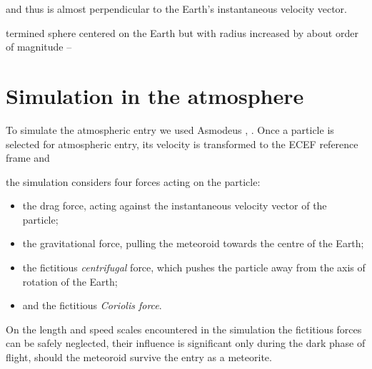      and thus is almost perpendicular to the Earth's instantaneous velocity vector.



    termined sphere centered on the Earth but with
    radius increased by about  order of magnitude --

\section{Simulation in the atmosphere}
    To simulate the atmospheric entry we used Asmodeus \citep{balaz-thesis}, \citep{balaz+2020}.
    Once a particle is selected for atmospheric entry, its velocity is transformed to the ECEF reference frame
    and 

    the simulation considers four forces acting on the particle:
    \begin{itemize}
        \item the drag force, acting against the instantaneous velocity vector of the particle;
        \item the gravitational force, pulling the meteoroid towards the centre of the Earth;
        \item the fictitious \emph{centrifugal} force, which pushes the particle away from the axis of rotation of the Earth;
        \item and the fictitious \emph{Coriolis force}.
    \end{itemize}

    On the length and speed scales encountered in the simulation the fictitious forces can be safely neglected,
    their influence is significant only during the dark phase of flight, should the meteoroid survive the entry as a meteorite.
